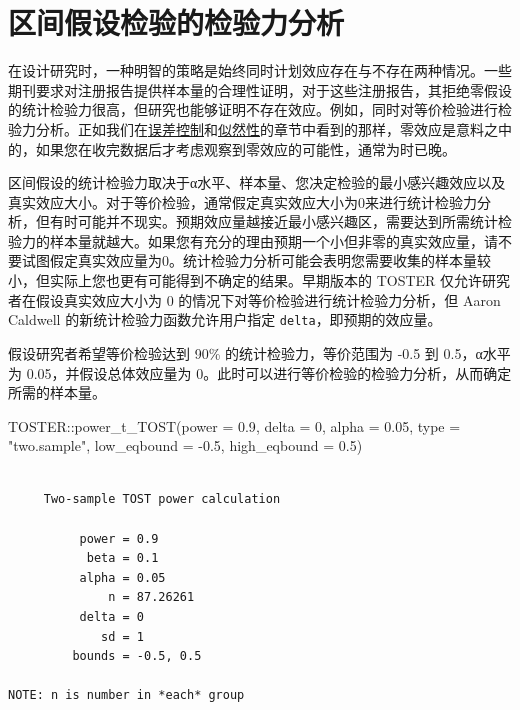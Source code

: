 \documentclass[
  letterpaper,
  DIV=11,
  numbers=noendperiod]{scrreprt}
\newenvironment{Shaded}{\begin{snugshade}}{\end{snugshade}}
\newcommand{\AttributeTok}[1]{\textcolor[rgb]{0.40,0.45,0.13}{#1}}
\newcommand{\DecValTok}[1]{\textcolor[rgb]{0.68,0.00,0.00}{#1}}
\newcommand{\FloatTok}[1]{\textcolor[rgb]{0.68,0.00,0.00}{#1}}
\newcommand{\FunctionTok}[1]{\textcolor[rgb]{0.28,0.35,0.67}{#1}}
\newcommand{\NormalTok}[1]{\textcolor[rgb]{0.00,0.23,0.31}{#1}}
\newcommand{\SpecialCharTok}[1]{\textcolor[rgb]{0.37,0.37,0.37}{#1}}
\newcommand{\StringTok}[1]{\textcolor[rgb]{0.13,0.47,0.30}{#1}}
\begin{document}
\hypertarget{ux533aux95f4ux5047ux8bbeux68c0ux9a8cux7684ux68c0ux9a8cux529bux5206ux6790}{%
\section{区间假设检验的检验力分析}\label{ux533aux95f4ux5047ux8bbeux68c0ux9a8cux7684ux68c0ux9a8cux529bux5206ux6790}}

在设计研究时，一种明智的策略是始终同时计划效应存在与不存在两种情况。一些期刊要求对注册报告提供样本量的合理性证明，对于这些注册报告，其拒绝零假设的统计检验力很高，但研究也能够证明不存在效应。例如，同时对等价检验进行检验力分析。正如我们在\protect\hyperlink{errorcontrol}{误差控制}和\protect\hyperlink{likelihoods}{似然性}的章节中看到的那样，零效应是意料之中的，如果您在收完数据后才考虑观察到零效应的可能性，通常为时已晚。

区间假设的统计检验力取决于α水平、样本量、您决定检验的最小感兴趣效应以及真实效应大小。对于等价检验，通常假定真实效应大小为0来进行统计检验力分析，但有时可能并不现实。预期效应量越接近最小感兴趣区，需要达到所需统计检验力的样本量就越大。如果您有充分的理由预期一个小但非零的真实效应量，请不要试图假定真实效应量为0。统计检验力分析可能会表明您需要收集的样本量较小，但实际上您也更有可能得到不确定的结果。早期版本的
TOSTER 仅允许研究者在假设真实效应大小为 0
的情况下对等价检验进行统计检验力分析，但 Aaron Caldwell
的新统计检验力函数允许用户指定 \texttt{delta}，即预期的效应量。

假设研究者希望等价检验达到 90\% 的统计检验力，等价范围为 -0.5 到
0.5，α水平为 0.05，并假设总体效应量为
0。此时可以进行等价检验的检验力分析，从而确定所需的样本量。

\begin{Shaded}
\begin{Highlighting}[]
\NormalTok{TOSTER}\SpecialCharTok{::}\FunctionTok{power\_t\_TOST}\NormalTok{(}\AttributeTok{power =} \FloatTok{0.9}\NormalTok{, }\AttributeTok{delta =} \DecValTok{0}\NormalTok{,}
                     \AttributeTok{alpha =} \FloatTok{0.05}\NormalTok{, }\AttributeTok{type =} \StringTok{"two.sample"}\NormalTok{,}
                     \AttributeTok{low\_eqbound =} \SpecialCharTok{{-}}\FloatTok{0.5}\NormalTok{, }\AttributeTok{high\_eqbound =} \FloatTok{0.5}\NormalTok{)}
\end{Highlighting}
\end{Shaded}

\begin{verbatim}

     Two-sample TOST power calculation 

          power = 0.9
           beta = 0.1
          alpha = 0.05
              n = 87.26261
          delta = 0
             sd = 1
         bounds = -0.5, 0.5

NOTE: n is number in *each* group
\end{verbatim}
\end{document}
